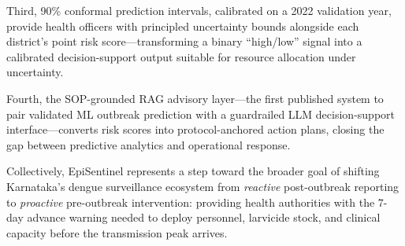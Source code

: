 \documentclass[conference]{IEEEtran}
\begin{document}
Third, 90\% conformal prediction intervals, calibrated on a 2022
validation year, provide health officers with principled uncertainty
bounds alongside each district's point risk score---transforming
a binary ``high/low'' signal into a calibrated decision-support
output suitable for resource allocation under uncertainty.

Fourth, the SOP-grounded RAG advisory layer---the first published
system to pair validated ML outbreak prediction with a guardrailed
LLM decision-support interface---converts risk scores into
protocol-anchored action plans, closing the gap between predictive
analytics and operational response.

Collectively, EpiSentinel represents a step toward the broader goal
of shifting Karnataka's dengue surveillance ecosystem from
\emph{reactive} post-outbreak reporting to \emph{proactive}
pre-outbreak intervention: providing health authorities with the
7-day advance warning needed to deploy personnel, larvicide stock,
and clinical capacity before the transmission peak arrives.

\balance

\end{document}
